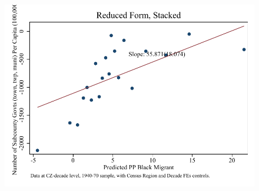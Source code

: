\documentclass{article}
\begin{document}
\begin{figure}
\centering
\includegraphics{figures/simplefigs/stacked_gen_subcounty_pc_C3_urban_rf.pdf}
\end{figure}
\clearpage
\end{document}
